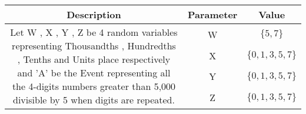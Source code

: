 
\providecommand{\pr}[1]{\ensuremath{\Pr\left(#1\right)}}


\begin{center}
\large \begin{tabular}{|c|c|c|}
     \hline
     Description & Parameter & Value  \\
     \hline 
     \multirow{4}{*}{\parbox{12cm}{Let W , X , Y , Z be 4 random variables representing Thousandths , Hundredths , Tenths and Units place respectively and 'A' be the Event representing all the 4-digits numbers greater than 5,000 divisible by 5 when digits are repeated.}} & W &  $\{5,7\}$ \\
                          & X &  $\{0,1,3,5,7\}$  \\
                          & Y &  $\{0,1,3,5,7\}$  \\
                          & Z &  $\{0,1,3,5,7\}$  \\
     \hline
 \end{tabular} 
 \end{center}
